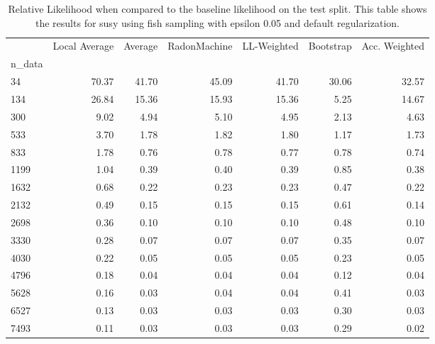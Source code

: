 \begin{table}
\centering
\caption{Relative Likelihood when compared to the baseline likelihood on the test split. This table shows the results for  susy using  fish sampling with epsilon  0.05 and  default regularization.}
\label{tab:13}
\begin{tabular}{lrrrrrr}
\toprule
{} &  Local Average &  Average &  RadonMachine &  LL-Weighted &  Bootstrap &  Acc. Weighted \\
n\_data &                &          &               &              &            &                \\
\midrule
34     &          70.37 &    41.70 &         45.09 &        41.70 &      30.06 &          32.57 \\
134    &          26.84 &    15.36 &         15.93 &        15.36 &       5.25 &          14.67 \\
300    &           9.02 &     4.94 &          5.10 &         4.95 &       2.13 &           4.63 \\
533    &           3.70 &     1.78 &          1.82 &         1.80 &       1.17 &           1.73 \\
833    &           1.78 &     0.76 &          0.78 &         0.77 &       0.78 &           0.74 \\
1199   &           1.04 &     0.39 &          0.40 &         0.39 &       0.85 &           0.38 \\
1632   &           0.68 &     0.22 &          0.23 &         0.23 &       0.47 &           0.22 \\
2132   &           0.49 &     0.15 &          0.15 &         0.15 &       0.61 &           0.14 \\
2698   &           0.36 &     0.10 &          0.10 &         0.10 &       0.48 &           0.10 \\
3330   &           0.28 &     0.07 &          0.07 &         0.07 &       0.35 &           0.07 \\
4030   &           0.22 &     0.05 &          0.05 &         0.05 &       0.23 &           0.05 \\
4796   &           0.18 &     0.04 &          0.04 &         0.04 &       0.12 &           0.04 \\
5628   &           0.16 &     0.03 &          0.04 &         0.04 &       0.41 &           0.03 \\
6527   &           0.13 &     0.03 &          0.03 &         0.03 &       0.30 &           0.03 \\
7493   &           0.11 &     0.03 &          0.03 &         0.03 &       0.29 &           0.02 \\
\bottomrule
\end{tabular}
\end{table}
